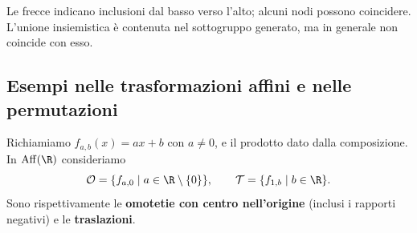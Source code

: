 \begin{center}
\end{center}
Le frecce indicano inclusioni dal basso verso l'alto; alcuni nodi possono coincidere. L'unione insiemistica è contenuta nel sottogruppo generato, ma in generale non coincide con esso.

\subsection{Esempi nelle trasformazioni affini e nelle permutazioni}
Richiamiamo $f_{a,b}(x)=ax+b$ con $a\ne0$, e il prodotto dato dalla composizione. In $\operatorname{Aff}(\R)$ consideriamo
\[
\mathcal O=\{f_{a,0}\mid a\in\R\setminus\{0\}\},\qquad
\mathcal T=\{f_{1,b}\mid b\in\R\}.
\]
Sono rispettivamente le \textbf{omotetie con centro nell'origine} (inclusi i rapporti negativi) e le \textbf{traslazioni}.


